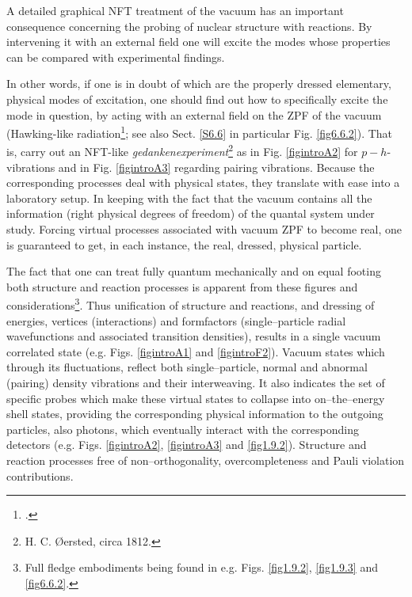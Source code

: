 A detailed graphical NFT treatment of the vacuum has an important consequence concerning the probing of nuclear structure with reactions. By intervening it with an external field one will excite the modes whose properties can be  compared with experimental findings.

In other words, if one is in doubt of which are the properly dressed elementary, physical modes of excitation, one should find out how to specifically excite the  mode in question, by acting with an external field on the ZPF of the vacuum (Hawking-like radiation\footnote{\cite{Barranco:19b}.}; see also Sect. \ref{S6.6} in particular Fig. \ref{fig6.6.2}). That is,  carry out an NFT-like \textit{gedankenexperiment}\footnote{H. C. \O{}ersted, circa 1812.} as in Fig. \ref{figintroA2} for $p-h$-vibrations and in Fig. \ref{figintroA3} regarding pairing vibrations. Because the corresponding processes deal  with physical states, they translate with ease into a laboratory setup. In keeping with the fact that the vacuum contains all the information (right physical degrees of freedom) of the quantal system under study. Forcing virtual processes associated  with vacuum ZPF to become real, one is guaranteed to get, in each instance, the real, dressed, physical particle. 

The fact that one can treat fully quantum mechanically and on equal footing both structure and reaction processes is apparent from these figures and considerations\footnote{Full fledge embodiments being found in e.g. Figs. \ref{fig1.9.2}, \ref{fig1.9.3} and  \ref{fig6.6.2}.}. Thus unification of structure and reactions, and dressing of energies, vertices (interactions) and formfactors (single--particle radial wavefunctions and associated transition densities), results in a single vacuum correlated state (e.g. Figs. \ref{figintroA1} and \ref{figintroF2}). Vacuum states which through its fluctuations, reflect both single--particle, normal and abnormal (pairing) density vibrations and their interweaving.  It also indicates the  set of specific probes which make  these virtual states to collapse into on--the--energy shell states, providing the corresponding physical information to the   outgoing particles, also photons, which eventually interact with the corresponding detectors (e.g. Figs. \ref{figintroA2}, \ref{figintroA3} and \ref{fig1.9.2}). Structure and reaction processes free of non--orthogonality, overcompleteness and Pauli violation contributions.


